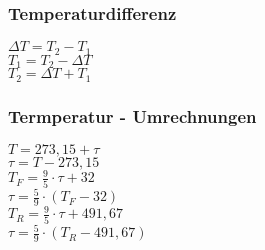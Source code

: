 \subsubsection{Temperaturdifferenz} 
\begin{minipage}{0.45\textwidth} 
$ \Delta T = T_{2}  - T_{1} $\\ 
$ T_{1}  = T_{2}  - \Delta T $\\ 
$ T_{2}  = \Delta T + T_{1} $\\ 
\end{minipage} 
\begin{minipage}{0.45\textwidth} 
 
\end{minipage} 
\subsubsection{Termperatur - Umrechnungen} 
\begin{minipage}{0.45\textwidth} 
$ T = 273,15 + \tau $\\ 
$ \tau  = T-273,15 $\\ 
$ T_{F}  = \frac{9}{5}\cdot \tau  +32 $\\ 
$ \tau  = \frac{5}{9}\cdot (T_{F}  - 32) $\\ 
$ T_{R}  = \frac{9}{5}\cdot \tau  + 491,67 $\\ 
$ \tau  = \frac{5}{9}\cdot (T_{R}  - 491,67) $\\ 
\end{minipage} 
\begin{minipage}{0.45\textwidth} 
 
\end{minipage} 
